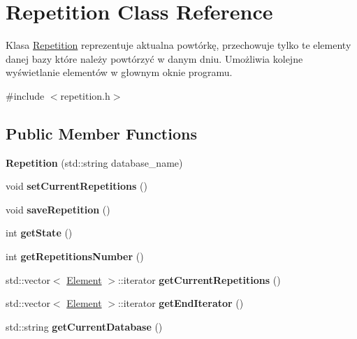 \hypertarget{class_repetition}{}\section{Repetition Class Reference}
\label{class_repetition}


Klasa \mbox{\hyperlink{class_repetition}{Repetition}} reprezentuje aktualna powtórkę, przechowuje tylko te elementy danej bazy które należy powtórzyć w danym dniu. Umożliwia kolejne wyświetlanie elementów w głownym oknie programu.  




{\ttfamily \#include $<$repetition.\+h$>$}

\subsection*{Public Member Functions}
\begin{DoxyCompactItemize}
\item 
\mbox{\label{class_repetition_a090f29e6791686f98f97d08aecd3e73f}} 
{\bfseries Repetition} (std\+::string database\+\_\+name)
\item 
\mbox{\label{class_repetition_ac4fc496f123f6889987b2fc1cc2cd6bc}} 
void {\bfseries set\+Current\+Repetitions} ()
\item 
\mbox{\label{class_repetition_ab0c80b930deaa082d58de162c94171ad}} 
void {\bfseries save\+Repetition} ()
\item 
\mbox{\label{class_repetition_ad7a38b006f3bea43c1e078c18696cd5a}} 
int {\bfseries get\+State} ()
\item 
\mbox{\label{class_repetition_a17b859f4c0018687e10c1a1f9fc73058}} 
int {\bfseries get\+Repetitions\+Number} ()
\item 
\mbox{\label{class_repetition_a61e44eaf56509396ab0f84f4a8b9dba6}} 
std\+::vector$<$ \mbox{\hyperlink{class_element}{Element}} $>$\+::iterator {\bfseries get\+Current\+Repetitions} ()
\item 
\mbox{\label{class_repetition_a6771c9a3a6800aa96ef3a1b57cc4f46b}} 
std\+::vector$<$ \mbox{\hyperlink{class_element}{Element}} $>$\+::iterator {\bfseries get\+End\+Iterator} ()
\item 
\mbox{\label{class_repetition_af6b10b986daed2831410200fafb44115}} 
std\+::string {\bfseries get\+Current\+Database} ()
\end{DoxyCompactItemize}


